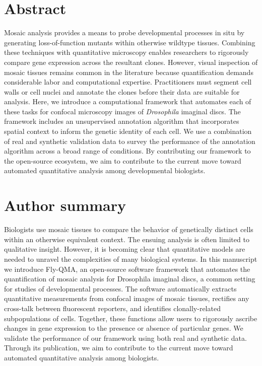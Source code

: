 \documentclass[10pt,letterpaper]{article}
\begin{document}
\section*{Abstract}
Mosaic analysis provides a means to probe developmental processes in situ by generating loss-of-function mutants within otherwise wildtype tissues. Combining these techniques with quantitative microscopy enables researchers to rigorously compare gene expression across the resultant clones. However, visual inspection of mosaic tissues remains common in the literature because quantification demands considerable labor and computational expertise. Practitioners must segment cell walls or cell nuclei and annotate the clones before their data are suitable for analysis. Here, we introduce a computational framework that automates each of these tasks for confocal microscopy images of \textit{Drosophila} imaginal discs. The framework includes an unsupervised annotation algorithm that incorporates spatial context to inform the genetic identity of each cell. We use a combination of real and synthetic validation data to survey the performance of the annotation algorithm across a broad range of conditions. By contributing our framework to the open-source ecosystem, we aim to contribute to the current move toward automated quantitative analysis among developmental biologists.


\section*{Author summary}
Biologists use mosaic tissues to compare the behavior of genetically distinct cells within an otherwise equivalent context. The ensuing analysis is often limited to qualitative insight. However, it is becoming clear that quantitative models are needed to unravel the complexities of many biological systems. In this manuscript we introduce Fly-QMA, an open-source software framework that automates the quantification of mosaic analysis for Drosophila imaginal discs, a common setting for studies of developmental processes. The software automatically extracts quantitative measurements from confocal images of mosaic tissues, rectifies any cross-talk between fluorescent reporters, and identifies clonally-related subpopulations of cells. Together, these functions allow users to rigorously ascribe changes in gene expression to the presence or absence of particular genes. We validate the performance of our framework using both real and synthetic data. Through its publication, we aim to contribute to the current move toward automated quantitative analysis among biologists.
\end{document}
